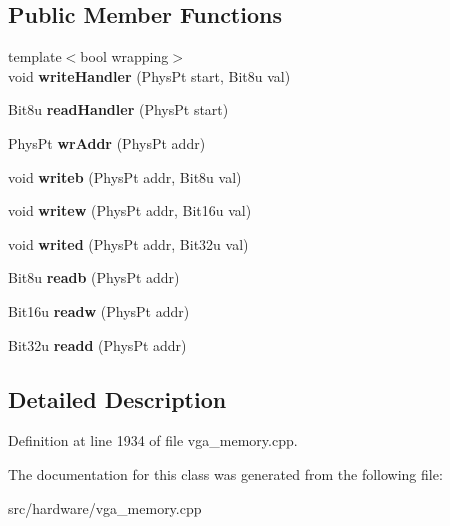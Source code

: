 \subsection*{Public Member Functions}
\begin{DoxyCompactItemize}
\item 
\hypertarget{classVGA__AMS__Handler_aeb0a1c400b9162e4e5e48bf0905d4865}{{\footnotesize template$<$bool wrapping$>$ }\\void {\bfseries write\-Handler} (Phys\-Pt start, Bit8u val)}\label{classVGA__AMS__Handler_aeb0a1c400b9162e4e5e48bf0905d4865}

\item 
\hypertarget{classVGA__AMS__Handler_a5661278164e2d7259ee9c8fe4c35d6df}{Bit8u {\bfseries read\-Handler} (Phys\-Pt start)}\label{classVGA__AMS__Handler_a5661278164e2d7259ee9c8fe4c35d6df}

\item 
\hypertarget{classVGA__AMS__Handler_a63b72ffd104220eb928c683bae72def3}{Phys\-Pt {\bfseries wr\-Addr} (Phys\-Pt addr)}\label{classVGA__AMS__Handler_a63b72ffd104220eb928c683bae72def3}

\item 
\hypertarget{classVGA__AMS__Handler_a885c0657d2d7ffd724b54fb5ab559fab}{void {\bfseries writeb} (Phys\-Pt addr, Bit8u val)}\label{classVGA__AMS__Handler_a885c0657d2d7ffd724b54fb5ab559fab}

\item 
\hypertarget{classVGA__AMS__Handler_a5ca68f0673d75103b87d5919b19b4b8d}{void {\bfseries writew} (Phys\-Pt addr, Bit16u val)}\label{classVGA__AMS__Handler_a5ca68f0673d75103b87d5919b19b4b8d}

\item 
\hypertarget{classVGA__AMS__Handler_ae1631976a85931c1a0a3dd6a4ec68b4c}{void {\bfseries writed} (Phys\-Pt addr, Bit32u val)}\label{classVGA__AMS__Handler_ae1631976a85931c1a0a3dd6a4ec68b4c}

\item 
\hypertarget{classVGA__AMS__Handler_a71185515db1bd0eba10316c09bfc54e9}{Bit8u {\bfseries readb} (Phys\-Pt addr)}\label{classVGA__AMS__Handler_a71185515db1bd0eba10316c09bfc54e9}

\item 
\hypertarget{classVGA__AMS__Handler_a9d850f1c8384f59762fe0e380bc5d90b}{Bit16u {\bfseries readw} (Phys\-Pt addr)}\label{classVGA__AMS__Handler_a9d850f1c8384f59762fe0e380bc5d90b}

\item 
\hypertarget{classVGA__AMS__Handler_a4aaa96ce06e4f5d451dcfb2e8522d082}{Bit32u {\bfseries readd} (Phys\-Pt addr)}\label{classVGA__AMS__Handler_a4aaa96ce06e4f5d451dcfb2e8522d082}

\end{DoxyCompactItemize}


\subsection{Detailed Description}


Definition at line 1934 of file vga\-\_\-memory.\-cpp.



The documentation for this class was generated from the following file\-:\begin{DoxyCompactItemize}
\item 
src/hardware/vga\-\_\-memory.\-cpp\end{DoxyCompactItemize}
